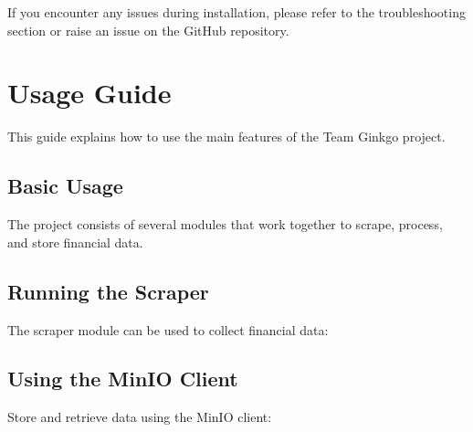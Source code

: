 \documentclass[letterpaper,10pt,english]{sphinxmanual}
\begin{document}
\sphinxAtStartPar
If you encounter any issues during installation, please refer to the troubleshooting section or raise an issue on the GitHub repository.

\sphinxstepscope


\chapter{Usage Guide}
\label{\detokenize{usage:usage-guide}}\label{\detokenize{usage:usage}}\label{\detokenize{usage::doc}}
\sphinxAtStartPar
This guide explains how to use the main features of the Team Ginkgo project.


\section{Basic Usage}
\label{\detokenize{usage:basic-usage}}
\sphinxAtStartPar
The project consists of several modules that work together to scrape, process, and store financial data.


\section{Running the Scraper}
\label{\detokenize{usage:running-the-scraper}}
\sphinxAtStartPar
The scraper module can be used to collect financial data:

\begin{sphinxVerbatim}[commandchars=\\\{\}]
 

  

\end{sphinxVerbatim}


\section{Using the MinIO Client}
\label{\detokenize{usage:using-the-minio-client}}
\sphinxAtStartPar
Store and retrieve data using the MinIO client:
\end{document}
